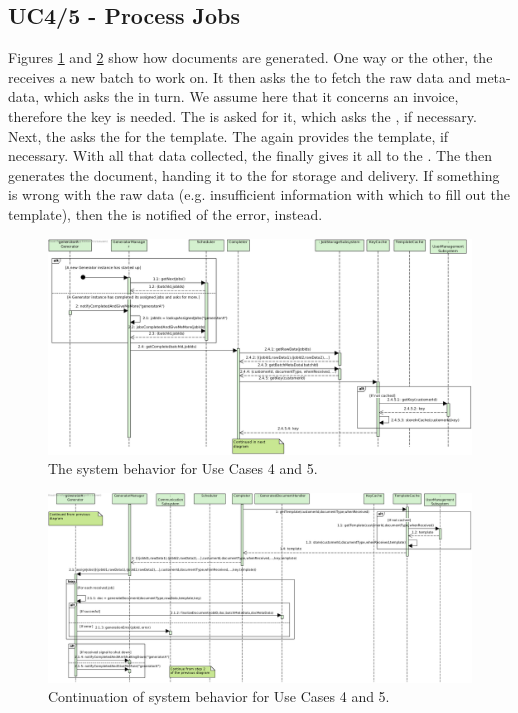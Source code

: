 \subsection{UC4/5 - Process Jobs}
Figures \ref{fig:seq_uc45_1} and \ref{fig:seq_uc45_2} show how documents are generated. One way or the other, the  receives a new batch to work on. It then asks the  to fetch the raw data and meta-data, which asks the  in turn. We assume here that it concerns an invoice, therefore the key is needed. The  is asked for it, which asks the , if necessary. Next, the  asks the  for the template. The  again provides the template, if necessary. With all that data collected, the  finally gives it all to the . The  then generates the document, handing it to the  for storage and delivery. If something is wrong with the raw data (e.g. insufficient information with which to fill out the template), then the  is notified of the error, instead.

\begin{figure}[!htp]
    \centering
    \includegraphics[width=\textwidth]{figures/UC4_5 - ProcessJobs1.png}
    \caption{The system behavior for Use Cases 4 and 5.
        }\label{fig:seq_uc45_1}
\end{figure}

\begin{figure}[!htp]
    \centering
    \includegraphics[width=\textwidth]{figures/UC4_5 - ProcessJobs2.png}
    \caption{Continuation of system behavior for Use Cases 4 and 5.
        }\label{fig:seq_uc45_2}
\end{figure}

